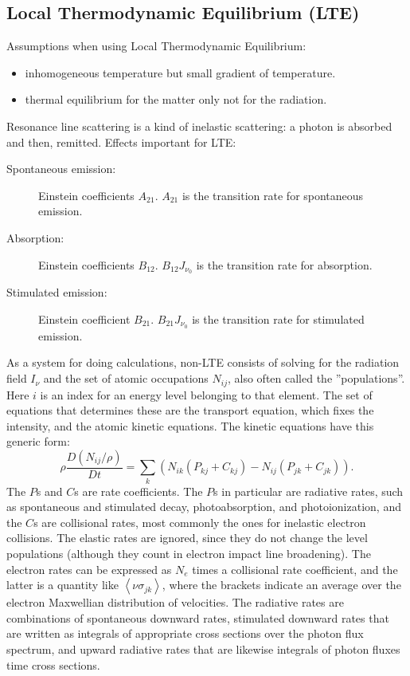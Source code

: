 \documentclass[letterpaper]{report}
\newcommand\la{\left\langle}
\newcommand\ra{\right\rangle}
\renewcommand{\(}{\left(}
\renewcommand{\)}{\right)}
\renewcommand{\[}{\left[}
\renewcommand{\]}{\right]}
\begin{document}
\subsection{Local Thermodynamic Equilibrium (LTE)}
Assumptions when using Local Thermodynamic Equilibrium:
\begin{itemize}
  \item inhomogeneous temperature but small gradient of temperature.
  \item thermal equilibrium for the matter only not for the radiation.
\end{itemize}
Resonance line scattering is a kind of inelastic scattering: a photon is
absorbed and then, remitted. Effects important for LTE:
\begin{description}
  \item[Spontaneous emission:] Einstein coefficients $A_{21}$. $A_{21}$
  is the transition rate for spontaneous emission.
  \item[Absorption:] Einstein coefficients $B_{12}$. $B_{12}J_{\nu_0}$ is the
  transition rate for absorption.
  \item[Stimulated emission:] Einstein coefficient $B_{21}$. $B_{21}J_{\nu_0}$
  is the transition rate for stimulated emission.
\end{description}
As a system for doing calculations, non-LTE consists of solving for the
radiation field $I_{\nu}$ and the set of atomic occupations $N_{ij}$, also
often called the ''populations''. Here $i$ is an index for an energy level
belonging to that element. The set of equations that determines these are the
transport equation, which fixes the intensity, and the atomic kinetic
equations. The kinetic equations have this generic form:
\begin{equation}
  \rho\frac{D\(N_{ij}/\rho\)}{Dt} = \sum_k\(N_{ik}\(P_{kj}+C_{kj}\) - N_{ij}
  \(P_{jk}+C_{jk}\)\).
  \label{9.1}
\end{equation}
The $P$s and $C$s are rate coefficients. The $P$s in particular are radiative
rates, such as spontaneous and stimulated decay, photoabsorption, and
photoionization, and the $C$s are collisional rates, most commonly the ones for
inelastic electron collisions. The elastic rates are ignored, since they do
not change the level populations (although they count in electron impact line
broadening). The electron rates can be expressed as $N_e$ times a collisional
rate coefficient, and the latter is a quantity like $\la\nu\sigma_{jk}\ra$,
where the brackets indicate an average over the electron Maxwellian
distribution of velocities. The radiative rates are combinations of
spontaneous downward rates, stimulated downward rates that are written as
integrals of appropriate cross sections over the photon flux spectrum, and
upward radiative rates that are likewise integrals of photon fluxes time cross
sections.
\end{document}

